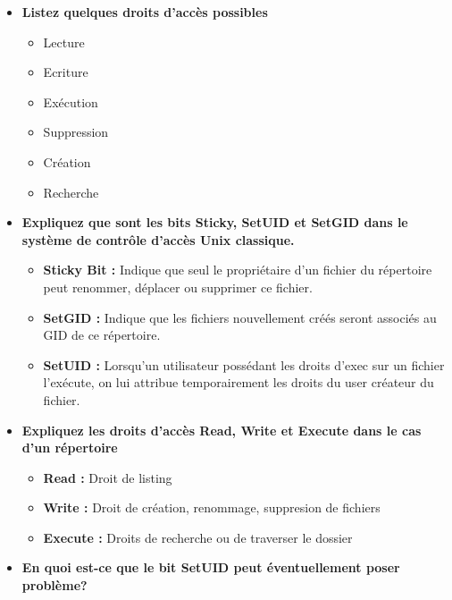 \documentclass{report}
\begin{document}
\begin{itemize}
				\item \textbf{Listez quelques droits d'accès possibles}\\

					\begin{itemize}
						\item Lecture
						\item Ecriture
						\item Exécution
						\item Suppression
						\item Création
						\item Recherche
					\end{itemize}

				\item \textbf{Expliquez que sont les bits Sticky, SetUID et SetGID dans le système de contrôle d'accès Unix classique.}\\

					\begin{itemize}
						\item \textbf{Sticky Bit : } Indique que seul le propriétaire d'un fichier du répertoire peut renommer, déplacer ou supprimer ce fichier.
						\item \textbf{SetGID : } Indique que les fichiers nouvellement créés seront associés au GID de ce répertoire.
						\item \textbf{SetUID : } Lorsqu'un utilisateur possédant les droits d'exec sur un fichier l'exécute, on lui attribue temporairement les droits du user créateur du fichier.\\
					\end{itemize}

				\item \textbf{Expliquez les droits d'accès Read, Write et Execute dans le cas d'un répertoire}\\

					\begin{itemize}
						\item \textbf{Read : } Droit de listing
						\item \textbf{Write : } Droit de création, renommage, suppresion de fichiers
						\item \textbf{Execute : } Droits de recherche ou de traverser le dossier
					\end{itemize}

				\item \textbf{En quoi est-ce que le bit SetUID peut éventuellement poser problème?}\\


\end{itemize}
\end{document}
